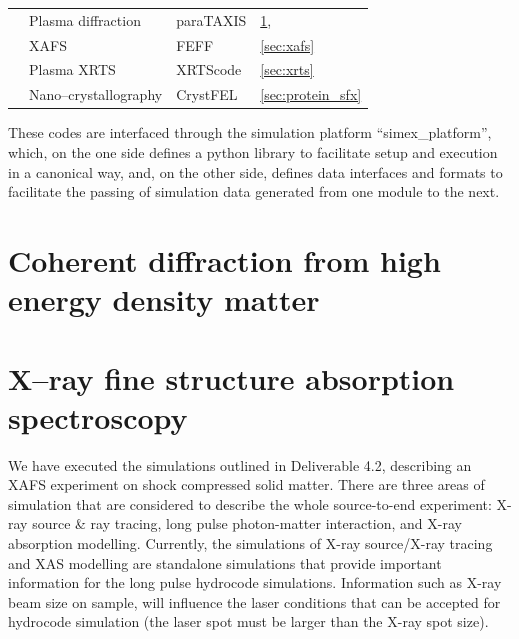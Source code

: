 \documentclass[12pt]{scrartcl}
\begin{document}
\begin{table}
\begin{center}
\begin{tabular}[ht]{|l|l|l|l|}
      & Plasma diffraction              & paraTAXIS             &
      \ref{sec:plasma_diffraction},\cite{EUCALL_SIMEX_D4.1,Kluge2016,
      Garten2017.zenodo.885033}  \\
      & XAFS                            & FEFF                  & \ref{sec:xafs}
      \cite{EUCALL_SIMEX_D4.2,Torchio2016,Harmand2015,Mazevet2014}  \\
      & Plasma XRTS                     & XRTScode              & \ref{sec:xrts} \cite{Fortmann2009d}               \\
      & Nano--crystallography           & CrystFEL              & \ref{sec:protein_sfx}         \\
    \hline
  \end{tabular}
  \end{center}
\end{table}

These codes are interfaced through the simulation platform ``simex\_platform'', which,
on the one side defines a python library to facilitate setup
and execution in a canonical way, and, on the other side, defines data interfaces
and formats to facilitate the passing of simulation data generated from one
module to the next.

\section{Coherent diffraction from high energy density matter}\label{sec:plasma_diffraction}


\section{X--ray fine structure absorption spectroscopy\label{sec:xafs}}
%
We have executed the simulations outlined in Deliverable
4.2\cite{EUCALL_SIMEX_D4.2}, describing an XAFS experiment on shock compressed
solid matter. There are three areas of simulation that are considered to describe the 
whole source-to-end experiment: X-ray source \& ray tracing, long pulse photon-matter 
interaction, and X-ray absorption modelling. Currently, the simulations of X-ray 
source/X-ray tracing and XAS modelling are standalone simulations that provide 
important information for the long pulse hydrocode simulations. Information 
such as X-ray beam size on sample, will influence the laser conditions that can 
be accepted for hydrocode simulation (the laser spot must be larger than the 
X-ray spot size).
\end{document}
